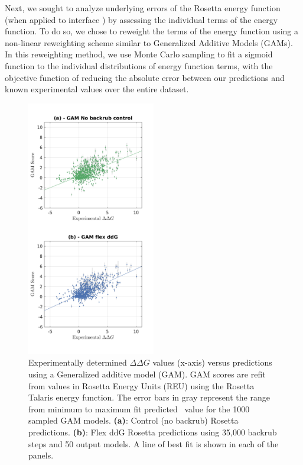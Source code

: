 Next, we sought to analyze underlying errors of the Rosetta energy function (when applied to interface \ddg) by assessing the individual terms of the energy function. To do so, we chose to reweight the terms of the energy function using a non-linear reweighting scheme similar to Generalized Additive Models (GAMs)\cite{hastie_generalized_1990}.
In this reweighting method, we use Monte Carlo sampling to fit a sigmoid function to the individual distributions of energy function terms, with the objective function of reducing the absolute error between our predictions and known experimental values over the entire dataset.

\begin{figure}
  \includegraphics[width=0.5\textwidth,keepaspectratio]{figures/zemu-sigmoid2-corrs-main.png}
  \caption[]{
    Experimentally determined $\Delta\Delta G$ values (x-axis) versus predictions using a Generalized additive model (GAM).
    GAM scores are refit from values in Rosetta Energy Units (REU) using the Rosetta Talaris\cite{song_structure-guided_2011,shapovalov_smoothed_2011,omeara_combined_2015} energy function.
    The error bars in gray represent the range from minimum to maximum fit predicted \ddg\ value for the 1000 sampled GAM models.
    \textbf{(a)}: Control (no backrub) Rosetta predictions.
    \textbf{(b)}: Flex ddG Rosetta predictions using 35,000 backrub steps and 50 output models.
    A line of best fit is shown in each of the panels.
  } \label{fig:t14-fit-scatter-main}
\end{figure}

